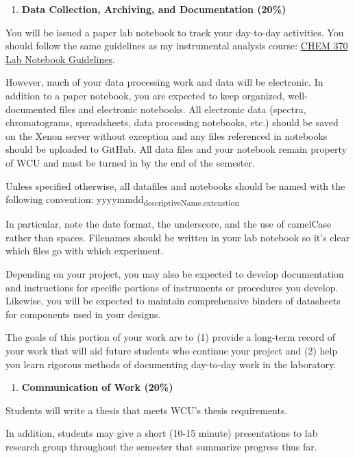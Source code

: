 \documentclass[11pt]{article}
\begin{document}
\begin{enumerate}
\item \textbf{Data Collection, Archiving, and Documentation (20\%)}
\end{enumerate}

You will be issued a paper lab notebook to track your day-to-day activities. You should follow the same guidelines as my instrumental analysis course: \href{https://chem370.github.io/lab-notebooks/}{CHEM 370 Lab Notebook Guidelines}.

However, much of your data processing work and data will be electronic. In addition to a paper notebook, you are expected to keep organized, well-documented files and electronic notebooks. All electronic data (spectra, chromatograms, spreadsheets, data processing notebooks, etc.) should be saved on the Xenon server without exception and any files referenced in notebooks should be uploaded to GitHub. All data files and your notebook remain property of WCU and must be turned in by the end of the semester.

Unless specified otherwise, all datafiles and notebooks should be named with the following convention: yyyymmdd\textsubscript{descriptiveName.extenstion}

In particular, note the date format, the underscore, and the use of camelCase rather than spaces. Filenames should be written in your lab notebook so it’s clear which files go with which experiment.

Depending on your project, you may also be expected to develop documentation and instructions for specific portions of instruments or procedures you develop. Likewise, you will be expected to maintain comprehensive binders of datasheets for components used in your designs.

The goals of this portion of your work are to (1) provide a long-term record of your work that will aid future students who continue your project and (2) help you learn rigorous methods of documenting day-to-day work in the laboratory.

\begin{enumerate}
\item \textbf{Communication of Work (20\%)}
\end{enumerate}

Students will write a thesis that meets WCU's thesis requirements.

In addition, students may give a short (10-15 minute) presentations to lab research group throughout the semester that summarize progress thus far.
\end{document}
